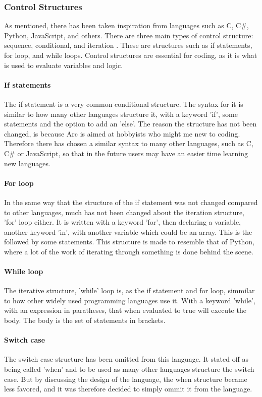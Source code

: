 \subsubsection{Control Structures}
As mentioned, there has been taken inspiration from languages such as C, C\#, Python, JavaScript, and others. There are three main types of control structure: sequence, conditional, and iteration \cite*{CBook}. These are structures such as if statements, for loop, and while loops. Control structures are essential for coding, as it is what is used to evaluate variables and logic.

\paragraph*{If statements}
The if statement is a very common conditional structure. The syntax for it is similar to how many other languages structure it, with a keyword 'if', some statements and the option to add an 'else'. The reason the structure has not been changed, is because Arc is aimed at hobbyists who might me new to coding. Therefore there has chosen a similar syntax to many other languages, such as C, C\# or JavaScript, so that in the future users may have an easier time learning new languages.

\paragraph*{For loop}
In the same way that the structure of the if statement was not changed compared to other languages, much has not been changed about the iteration structure, 'for' loop either. It is written with a keyword 'for', then declaring a variable, another keyword 'in', with another variable which could be an array. This is the followed by some statements.
This structure is made to resemble that of Python, where a lot of the work of iterating through something is done behind the scene.

\paragraph*{While loop}
The iterative structure, 'while' loop is, as the if statement and for loop, simmilar to how other widely used programming languages use it. With a keyword 'while', with an expression in paratheses, that when evaluated to true will execute the body. The body is the set of statements in brackets. 

\paragraph*{Switch case}
The switch case structure has been omitted from this language. It stated off as being called 'when' and to be used as many other languages structure the switch case. But by discussing the design of the language, the when structure became less favored, and it was therefore decided to simply ommit it from the language.



